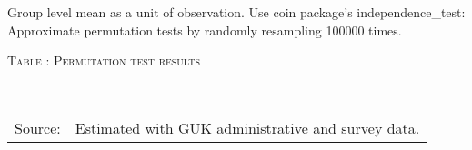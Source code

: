 \setlength{\parindent}{1em}
\vspace{2ex}




Group level mean as a unit of observation. Use \textsf{coin} package's \textsf{independence\_test}: Approximate permutation tests by randomly resampling 100000 times.


\hspace{-1.0cm}\begin{minipage}[t]{15cm}
\hfil\textsc{\normalsize Table \thetable: Permutation test results\label{tab perm}}\\
\setlength{\tabcolsep}{.5pt}
\setlength{\baselineskip}{8pt}
\renewcommand{\arraystretch}{.50}
\hfil{}\\
\renewcommand{\arraystretch}{.8}
\setlength{\tabcolsep}{1pt}
\begin{tabular}{>{\hfill\scriptsize}p{1cm}<{}>{\scriptsize}p{13cm}<{\hfill}}
Source:& \scriptsize Estimated with GUK administrative and survey data.\\

\end{tabular}
\end{minipage}
